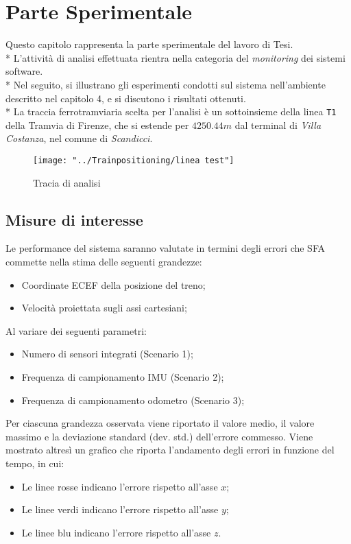 \chapter{Parte Sperimentale}
Questo capitolo rappresenta la parte sperimentale del lavoro di Tesi.\\*
L'attivit\`a di analisi effettuata rientra nella categoria del \emph{monitoring} dei sistemi software.\\*
Nel seguito, si illustrano gli esperimenti condotti sul sistema nell'ambiente descritto nel capitolo 4, e si discutono i risultati ottenuti.\\*
La traccia ferrotramviaria scelta per l'analisi \`e un sottoinsieme della linea \texttt{T1} della Tramvia di Firenze, che si estende per $4250.44 m$ dal terminal di \emph{Villa Costanza}, nel comune di \emph{Scandicci}. 
\begin{figure}[h]
	\centering
	\texttt{[image: "../Trainpositioning/linea test"]}
	\caption{Tracia di analisi}
	\label{fig:linea-test}
\end{figure}\clearpage
\section{Misure di interesse}
Le performance del sistema saranno valutate in termini degli errori che SFA commette nella stima delle seguenti grandezze:
\begin{itemize}
	\item Coordinate ECEF della posizione del treno;
	\item Velocit\`a proiettata sugli assi cartesiani;
\end{itemize}
Al variare dei seguenti parametri:
\begin{itemize}
	\item Numero di sensori integrati (Scenario 1);
	\item Frequenza di campionamento IMU (Scenario 2);
	\item Frequenza di campionamento odometro (Scenario 3);
\end{itemize}
Per ciascuna grandezza osservata viene riportato il valore medio, il valore massimo e la deviazione standard (dev. std.) dell'errore commesso. Viene mostrato altres\`i un grafico che riporta l'andamento degli errori in funzione del tempo, in cui:
\begin{itemize}
	\item Le linee rosse indicano l'errore rispetto all'asse $x$;
	\item Le linee verdi indicano l'errore rispetto all'asse $y$;
	\item Le linee blu indicano l'errore rispetto all'asse $z$.
\end{itemize}
